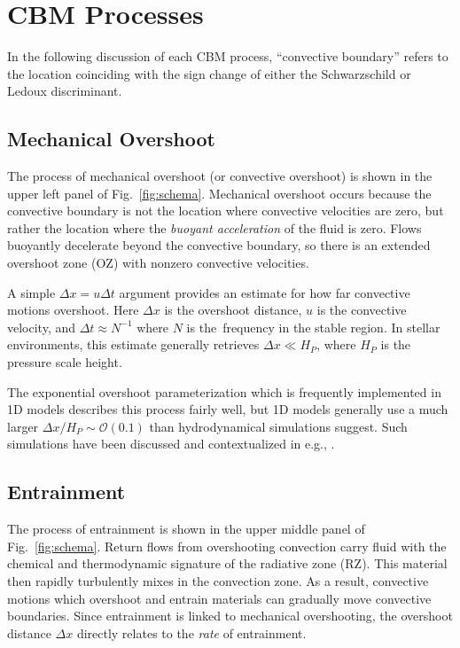 \section{CBM Processes}
\label{sec:processes}

In the following discussion of each CBM process, ``convective boundary'' refers to the location coinciding with the sign change of either the Schwarzschild or Ledoux discriminant.

\subsection{Mechanical Overshoot}
The process of mechanical overshoot (or convective overshoot) is shown in the upper left panel of Fig.~\ref{fig:schema}.
Mechanical overshoot occurs because the convective boundary is not the location where convective velocities are zero, but rather the location where the \emph{buoyant acceleration} of the fluid is zero.
Flows buoyantly decelerate beyond the convective boundary, so there is an extended overshoot zone (OZ) with nonzero convective velocities.

A simple $\Delta x = u \Delta t$ argument provides an estimate for how far convective motions overshoot.
Here $\Delta x$ is the overshoot distance, $u$ is the convective velocity, and $\Delta t \approx N^{-1}$ where $N$ is the \brunt$\,$frequency in the stable region.
In stellar environments, this estimate generally retrieves $\Delta x \ll H_P$, where $H_P$ is the pressure scale height.

The exponential overshoot parameterization \citep[per e.g.,][]{herwig_2000} which is frequently implemented in 1D models describes this process fairly well, but 1D models generally use a much larger $\Delta x/H_P \sim \mathcal{O}(0.1)$ than hydrodynamical simulations suggest.
Such simulations have been discussed and contextualized in e.g., \citet{korre_etal_2019}.


\subsection{Entrainment}
The process of entrainment is shown in the upper middle panel of Fig.~\ref{fig:schema}.
Return flows from overshooting convection carry fluid with the chemical and thermodynamic signature of the radiative zone (RZ).
This material then rapidly turbulently mixes in the convection zone.
As a result, convective motions which overshoot and entrain materials can gradually move convective boundaries.
Since entrainment is linked to mechanical overshooting, the overshoot distance $\Delta x$ directly relates to the \emph{rate} of entrainment.

